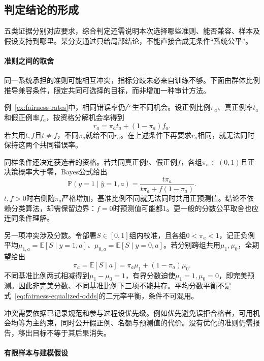 \subsection{判定结论的形成}
\label{sec:fairness-compatibility}

五类证据分别对应要求，综合判定还需说明本次选择哪些准则、能否兼容、样本及假设支持到哪里。某分支通过只给局部结论，不能直接合成无条件“系统公平”。

\paragraph{准则之间的取舍}

同一系统承担的准则可能相互冲突，指标分歧未必来自训练不够。下面由群体比例推导兼容条件，限定共同可选择的目标，而非增加一种审计方法。

例~\ref{ex:fairness-rates}中，相同错误率仍产生不同机会。设正例比例$\pi_a$、真正例率$t_a$和假正例率$f_a$，按资格分解机会率得到
\[
 r_a=\pi_a t_a+(1-\pi_a)f_a.
\]
若共用$t,f$且$t\ne f$，不同$\pi_a$就给不同$r_a$。在上述条件下再要求$r_a$相同，就无法同时保持这两个共同错误率。

同样条件还决定获选者的资格。若共同真正例$t$、假正例$f$，各组$\pi_a\in(0,1)$且正决策概率大于零，Bayes公式给出
\begin{equation}
 \mathbb P(y=1\mid\hat y=1,a)
 =\frac{t\pi_a}{t\pi_a+f(1-\pi_a)}.
 \label{eq:fairness-predictive-value}
\end{equation}
$t,f>0$时右侧随$\pi_a$严格增加，基准比例不同就无法同时共用正预测值。结论不依赖分类算法，却需保留边界：$f=0$时预测值可能都1。更一般的分数公平取舍也应连同条件理解。

另一项冲突涉及分数。令部署$S\in[0,1]$组内校准，且各组$0<\pi_a<1$，记正负例平均$\mu_{1,a}=\mathbb E[S\mid y=1,a]$、$\mu_{0,a}=\mathbb E[S\mid y=0,a]$。若分别跨组共用$\mu_1,\mu_0$，全期望给出
\[
 \pi_a=\mathbb E[S\mid a]
       =\pi_a\mu_1+(1-\pi_a)\mu_0.
\]
不同基准比例两式相减得到$\mu_1-\mu_0=1$，有界分数迫使$\mu_1=1,\mu_0=0$，即完美预测。因此非完美分数、不同基准比例下三项不能共存。平均分数平衡不是式~\eqref{eq:fairness-equalized-odds}的二元率平衡，条件不可混用。

冲突需要依据已记录规范和参与过程设优先级。例如优先避免误拒合格者，可用机会均等为主约束，同时公开假正例、名额与预测值的代价。没有优化的准则仍需报告，移出目标不等于其后果消失。

\paragraph{有限样本与建模假设}
\label{sec:fairness-evidence}

